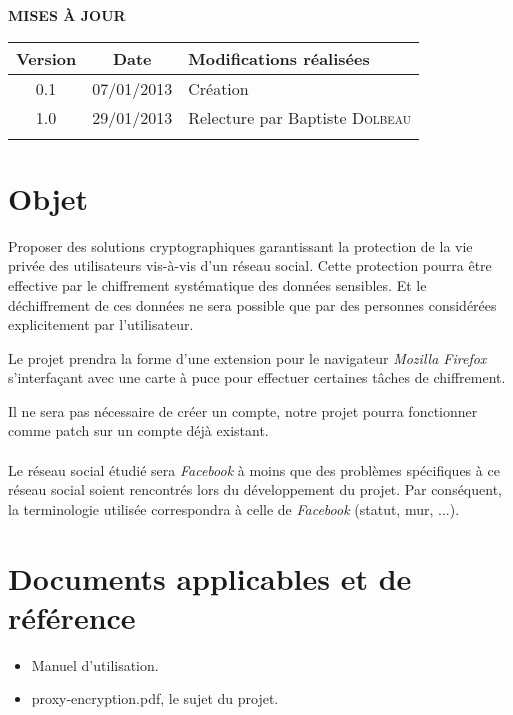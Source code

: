 \documentclass[a4paper,11pt,french]{article}
\begin{document}
\makeFirstPage
\clearpage

\vspace*{1cm}
\begin{center}
\textbf{\huge{MISES À JOUR}}\\
\vspace*{3cm}
	\begin{tabularx}{16cm}{|c|c|X|}
	\hline
	\bfseries{Version} & \bfseries{Date} & \bfseries{Modifications réalisées}\\
	\hline
	0.1 & 07/01/2013 & Création\\
	\hline
    1.0 & 29/01/2013 & Relecture par Baptiste \textsc{Dolbeau}\\
	\hline
	&&\\
	\hline
	\end{tabularx}
\end{center}

\clearpage
\tableofcontents
\clearpage

\section{Objet}
\renewcommand\labelitemi{\textbullet} %
\renewcommand\labelitemii{$\circ$} %
Proposer des solutions cryptographiques garantissant la protection de la vie 
privée des utilisateurs vis-à-vis d'un réseau social. Cette protection pourra
être effective par le chiffrement systématique des données sensibles. Et
le déchiffrement de ces données ne sera possible que par des personnes
considérées explicitement par l'utilisateur.


Le projet prendra la forme d'une extension pour le navigateur 
\emph{Mozilla Firefox}
s'interfaçant avec une carte à puce pour effectuer certaines tâches de 
chiffrement.

Il ne sera pas nécessaire de créer un compte, notre projet pourra fonctionner 
comme patch sur un compte déjà existant.

\paragraph{}
Le réseau social étudié sera \emph{Facebook} à moins que des problèmes spécifiques
à ce réseau social soient rencontrés lors du développement du projet.
Par conséquent, la terminologie utilisée correspondra à celle de \emph{Facebook} 
(statut, mur, ...).

\section{Documents applicables et de référence}
\begin{itemize}
    \item Manuel d'utilisation.
    \item proxy-encryption.pdf, le sujet du projet.
\end{itemize}
\end{document}
